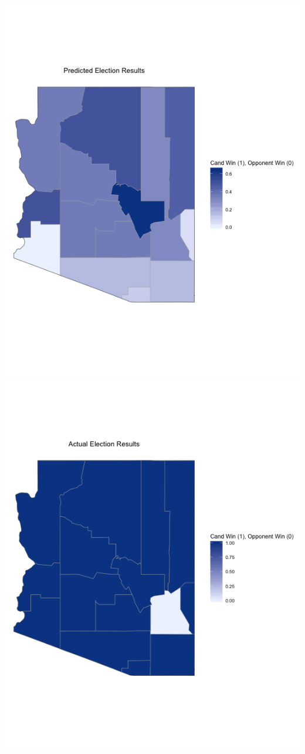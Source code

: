 \documentclass[11pt]{article}
\begin{document}
\includegraphics[scale=0.4]{../knn_plots/arizona_predicted.png} \includegraphics[scale=0.4]{../knn_plots/arizona_actual.png}\\
\end{document}
